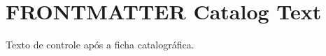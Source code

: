 \documentclass{abntexto-ufc}
\begin{document}
\pretextual

\ufcPrintTitlePage
{}

\textual
\section{FRONTMATTER Catalog Text}
Texto de controle após a ficha catalográfica.
\end{document}

